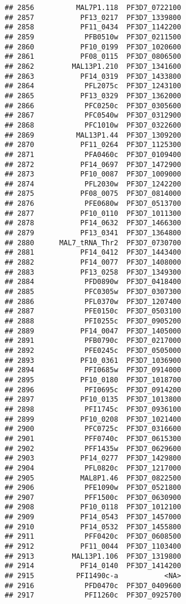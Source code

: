 \documentclass{article}\usepackage[]{graphicx}\usepackage[]{color}
\makeatletter
\newenvironment{kframe}{%
 \def\at@end@of@kframe{}%
 \ifinner\ifhmode%
  \def\at@end@of@kframe{\end{minipage}}%
  \begin{minipage}{\columnwidth}%
 \fi\fi%
 \def\FrameCommand##1{\hskip\@totalleftmargin \hskip-\fboxsep
 \colorbox{shadecolor}{##1}\hskip-\fboxsep
     \hskip-\linewidth \hskip-\@totalleftmargin \hskip\columnwidth}%
 \MakeFramed {\advance\hsize-\width
   \@totalleftmargin\z@ \linewidth\hsize
   \@setminipage}}%
 {\par\unskip\endMakeFramed%
 \at@end@of@kframe}
\newenvironment{knitrout}{}{} %
\makeatother
\begin{document}
\begin{knitrout}
\begin{kframe}
\begin{verbatim}
## 2856          MAL7P1.118  PF3D7_0722100
## 2857           PF13_0217  PF3D7_1339800
## 2858           PF11_0434  PF3D7_1142200
## 2859            PFB0510w  PF3D7_0211500
## 2860           PF10_0199  PF3D7_1020600
## 2861           PF08_0115  PF3D7_0806500
## 2862         MAL13P1.210  PF3D7_1341600
## 2863           PF14_0319  PF3D7_1433800
## 2864            PFL2075c  PF3D7_1243100
## 2865           PF13_0329  PF3D7_1362000
## 2866            PFC0250c  PF3D7_0305600
## 2867            PFC0540w  PF3D7_0312900
## 2868            PFC1010w  PF3D7_0322600
## 2869          MAL13P1.44  PF3D7_1309200
## 2870           PF11_0264  PF3D7_1125300
## 2871            PFA0460c  PF3D7_0109400
## 2872           PF14_0697  PF3D7_1472900
## 2873           PF10_0087  PF3D7_1009000
## 2874            PFL2030w  PF3D7_1242200
## 2875           PF08_0075  PF3D7_0814000
## 2876            PFE0680w  PF3D7_0513700
## 2877           PF10_0110  PF3D7_1011300
## 2878           PF14_0632  PF3D7_1466300
## 2879           PF13_0341  PF3D7_1364800
## 2880      MAL7_tRNA_Thr2  PF3D7_0730700
## 2881           PF14_0412  PF3D7_1443400
## 2882           PF14_0077  PF3D7_1408000
## 2883           PF13_0258  PF3D7_1349300
## 2884            PFD0890w  PF3D7_0418400
## 2885            PFC0305w  PF3D7_0307300
## 2886            PFL0370w  PF3D7_1207400
## 2887            PFE0150c  PF3D7_0503100
## 2888            PFI0255c  PF3D7_0905200
## 2889           PF14_0047  PF3D7_1405000
## 2891            PFB0790c  PF3D7_0217000
## 2892            PFE0245c  PF3D7_0505000
## 2893           PF10_0361  PF3D7_1036900
## 2894            PFI0685w  PF3D7_0914000
## 2895           PF10_0180  PF3D7_1018700
## 2896            PFI0695c  PF3D7_0914200
## 2897           PF10_0135  PF3D7_1013800
## 2898            PFI1745c  PF3D7_0936100
## 2899           PF10_0208  PF3D7_1021400
## 2900            PFC0725c  PF3D7_0316600
## 2901            PFF0740c  PF3D7_0615300
## 2902            PFF1435w  PF3D7_0629600
## 2903           PF14_0277  PF3D7_1429800
## 2904            PFL0820c  PF3D7_1217000
## 2905           MAL8P1.46  PF3D7_0822500
## 2906            PFE1090w  PF3D7_0521800
## 2907            PFF1500c  PF3D7_0630900
## 2908           PF10_0118  PF3D7_1012100
## 2909           PF14_0543  PF3D7_1457000
## 2910           PF14_0532  PF3D7_1455800
## 2911            PFF0420c  PF3D7_0608500
## 2912           PF11_0044  PF3D7_1103400
## 2913         MAL13P1.106  PF3D7_1319800
## 2914           PF14_0140  PF3D7_1414200
## 2915          PFI1490c-a           <NA>
## 2916            PFD0470c  PF3D7_0409600
## 2917            PFI1260c  PF3D7_0925700

\end{verbatim}
\end{kframe}
\end{knitrout}
\end{document}
